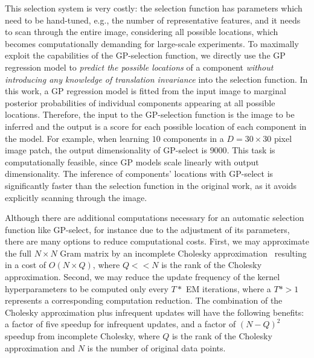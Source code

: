 This selection system is very costly: the selection function has parameters which need to be hand-tuned, e.g., the number of representative features, and %
it needs to scan through the entire image, considering all possible locations, which becomes computationally demanding for large-scale experiments.
%
To maximally exploit the capabilities of the GP-selection function, we directly use the GP regression model to \textit{predict the possible locations} of a component \textit{without introducing any knowledge of translation invariance} into the selection function. In this work, a GP regression model is fitted from the input image to marginal posterior probabilities of individual components appearing at all possible locations. Therefore, the input to the GP-selection function is the image to be inferred and the output is a score for each possible location of each component in the model.
For example, when learning $10$ components in a $D=30\times 30$ pixel image patch, the output dimensionality of GP-select is $9000$.
This task is computationally feasible, since GP models scale linearly with output dimensionality.
The inference of components' locations with GP-select is significantly faster than the selection function in the original work, as it avoids explicitly scanning through the image.

Although there are additional computations necessary for an automatic selection function like GP-select, for instance due to the adjustment of its parameters,  %
there are many options to reduce computational costs. %
First, we may approximate the full $N \times N$ Gram matrix by an incomplete Cholesky approximation~\citep{FinSch01} 
resulting in a cost of $O(N\times Q)$, where $Q << N$ is the rank of the Cholesky approximation.
%
Second, we may reduce the update frequency of the kernel hyperparameters to be computed only every $T\ast$ EM iterations, where a $T\ast > 1$ represents a corresponding computation reduction.
The combination of the Cholesky approximation plus infrequent updates will have the following benefits: a factor of five speedup for infrequent updates, and a factor of $(N-Q)^2$ speedup from incomplete Cholesky, where $Q$ is the rank of the Cholesky approximation and $N$ is the number of original data points. 

